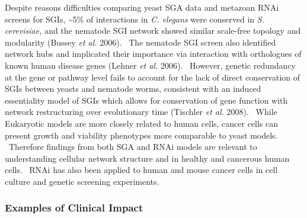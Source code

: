 Despite reasons difficulties comparing yeast SGA data and metazoan RNAi screens for SGIs, \~{}5\% of interactions in \textit{C. elegans} were conserved in \textit{S. cerevisiae,} and the nematode SGI network showed similar scale-free topology and modularity (Bussey\textit{ et al.} 2006). \ The nematode SGI screen also identified network hubs and implicated their importance via interaction with orthologues of known human disease genes (Lehner\textit{ et al.} 2006). \ However, genetic redundancy at the gene or pathway level fails to account for the lack of direct conservation of SGIs between yeasts and nematode worms, consistent with an induced essentiality model of SGIs which allows for conservation of gene function with network restructuring over evolutionary time (Tischler\textit{ et al.} 2008). \ While Eukaryotic models are more closely related to human cells, cancer cells can present growth and viability phenotypes more comparable to yeast models. \ Therefore findings from both SGA and RNAi models are relevant to understanding cellular network structure and in healthy and cancerous human cells. \ RNAi has also been applied to human and mouse cancer cells in cell culture and genetic screening experiments. \ 

\subsubsection[Examples of Clinical Impact]{Examples of Clinical Impact}


